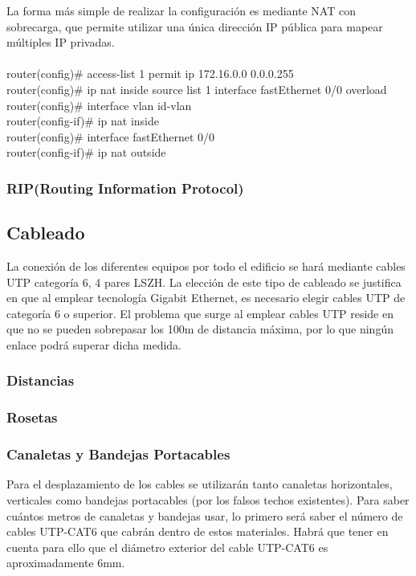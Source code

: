 \documentclass[a4paper,10pt]{article}
\begin{document}
La forma más simple de realizar la configuración es mediante NAT con sobrecarga, que permite utilizar una única dirección IP pública para mapear múltiples IP privadas.\\ \\
\textsf{router(config)\# access-list 1 permit ip 172.16.0.0 0.0.0.255\\
router(config)\# ip nat inside source list 1 interface  fastEthernet 0/0 overload\\
router(config)\# interface vlan id-vlan\\
router(config-if)\# ip nat inside\\
router(config)\# interface fastEthernet 0/0\\
router(config-if)\# ip nat outside}
\subsubsection{RIP(Routing Information Protocol)}

\subsection{Cableado}
La conexión de los diferentes equipos por todo el edificio se 
hará mediante cables UTP categoría 6, 4 pares LSZH.
La elección de este tipo de cableado se justifica en que al  emplear tecnología Gigabit Ethernet, es necesario elegir cables UTP de categoría 6 o superior. El problema que surge al emplear cables UTP reside en que no se pueden sobrepasar los 100m de distancia máxima, por lo que ningún enlace podrá superar dicha medida.
\subsubsection{Distancias}
\subsubsection{Rosetas}
\subsubsection{Canaletas y Bandejas Portacables}
Para el desplazamiento de los cables se utilizarán tanto canaletas horizontales, verticales como bandejas portacables (por los falsos techos existentes). Para saber cuántos metros de canaletas y bandejas usar, lo primero será saber el número de cables UTP-CAT6 que cabrán dentro de estos materiales. Habrá que tener en cuenta para ello que el diámetro exterior del cable UTP-CAT6 es aproximadamente 6mm.
\end{document}
